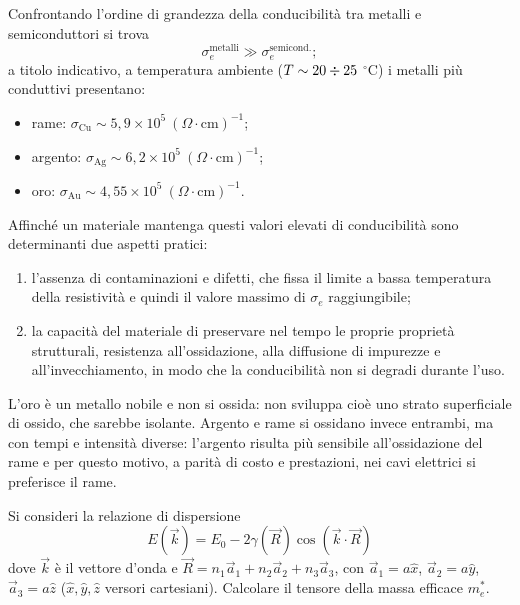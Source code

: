 Confrontando l'ordine di grandezza della conducibilità tra metalli e semiconduttori si trova
\begin{equation}
    \sigma_e^{\text{metalli}} \gg \sigma_e^{\text{semicond.}};
\end{equation}
a titolo indicativo, a temperatura ambiente (\( T \sim 20 \divisionsymbol 25 \) \(^{\circ}\)C) i metalli più conduttivi presentano:
\begin{itemize}
    \item rame: \( \sigma_{\text{Cu}} \sim 5{,}9 \times 10^5 \ (\Omega \cdot \text{cm})^{-1} \);
    \item argento: \( \sigma_{\text{Ag}} \sim 6{,}2 \times 10^5 \ (\Omega \cdot \text{cm})^{-1} \);
    \item oro: \( \sigma_{\text{Au}} \sim 4{,}55 \times 10^5 \ (\Omega \cdot \text{cm})^{-1} \).
\end{itemize}
Affinché un materiale mantenga questi valori elevati di conducibilità sono determinanti due aspetti pratici:
\begin{enumerate}
    \item l'assenza di contaminazioni e difetti, che fissa il limite a bassa temperatura della resistività e quindi il valore massimo di \( \sigma_e \) raggiungibile;
    \item la capacità del materiale di preservare nel tempo le proprie proprietà strutturali, resistenza all'ossidazione, alla diffusione di impurezze e all'invecchiamento, in modo che la conducibilità non si degradi durante l'uso.
\end{enumerate}

\begin{remark}
    L'oro è un metallo nobile e non si ossida: non sviluppa cioè uno strato superficiale di ossido, che sarebbe isolante. Argento e rame si ossidano invece entrambi, ma con tempi e intensità diverse: l'argento risulta più sensibile all'ossidazione del rame e per questo motivo, a parità di costo e prestazioni, nei cavi elettrici si preferisce il rame.
\end{remark}

\begin{exercise}
    Si consideri la relazione di dispersione
    \begin{equation}
        E(\vec{k}) = E_0 - 2 \gamma(\vec{R}) \cos(\vec{k} \cdot \vec{R})
    \end{equation}
    dove \( \vec{k} \) è il vettore d'onda e \( \vec{R} = n_1 \vec{a}_1 + n_2 \vec{a}_2 + n_3 \vec{a}_3 \), con \( \vec{a}_1 = a \hat{x} \), \( \vec{a}_2 = a \hat{y} \), \( \vec{a}_3 = a \hat{z} \) (\( \hat{x}, \hat{y}, \hat{z} \) versori cartesiani). Calcolare il tensore della massa efficace \( m_e^* \).
\end{exercise}

